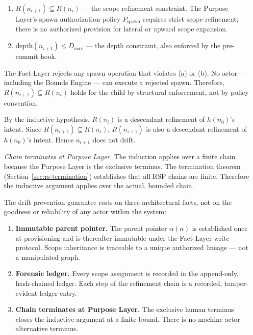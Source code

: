 \begin{enumerate}
    \item[(a)] $R(n_{i+1}) \subseteq R(n_i)$ — the scope refinement constraint. The Purpose Layer's spawn authorization policy $P_{\text{spawn}}$ requires strict scope refinement; there is no authorized provision for lateral or upward scope expansion.
    \item[(b)] $\text{depth}(n_{i+1}) \leq D_{\text{max}}$ — the depth constraint, also enforced by the pre-commit hook.
\end{enumerate}

The Fact Layer rejects any spawn operation that violates (a) or (b). No actor — including the Bounds Engine — can execute a rejected spawn. Therefore, $R(n_{i+1}) \subseteq R(n_i)$ holds for the child by structural enforcement, not by policy convention.

By the inductive hypothesis, $R(n_i)$ is a descendant refinement of $h(n_0)$'s intent. Since $R(n_{i+1}) \subseteq R(n_i)$, $R(n_{i+1})$ is also a descendant refinement of $h(n_0)$'s intent. Hence $n_{i+1}$ does not drift.

\medskip
\textit{Chain terminates at Purpose Layer.} The induction applies over a finite chain because the Purpose Layer is the exclusive terminus. The termination theorem (Section~\ref{sec:rs-termination}) establishes that all RSP chains are finite. Therefore the inductive argument applies over the actual, bounded chain.

\medskip
The drift prevention guarantee rests on three architectural facts, not on the goodness or reliability of any actor within the system:

\begin{enumerate}
    \item[(1)] \textbf{Immutable parent pointer.} The parent pointer $\alpha(n)$ is established once at provisioning and is thereafter immutable under the Fact Layer write protocol. Scope inheritance is traceable to a unique authorized lineage — not a manipulated graph.
    \item[(2)] \textbf{Forensic ledger.} Every scope assignment is recorded in the append-only, hash-chained ledger. Each step of the refinement chain is a recorded, tamper-evident ledger entry.
    \item[(3)] \textbf{Chain terminates at Purpose Layer.} The exclusive human terminus closes the inductive argument at a finite bound. There is no machine-actor alternative terminus.
\end{enumerate}

